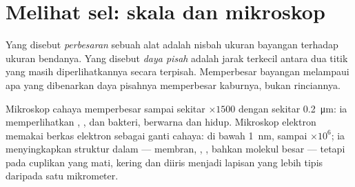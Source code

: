 \section{Melihat sel: skala dan mikroskop}

\begin{definition}\label{def:g10:cells-common-unit:magnification}
Yang disebut \emph{perbesaran} sebuah alat adalah
nisbah ukuran bayangan terhadap ukuran bendanya. Yang disebut
\emph{daya pisah} adalah jarak terkecil antara dua
titik yang masih diperlihatkannya secara terpisah. Memperbesar bayangan
melampaui apa yang dibenarkan daya pisahnya memperbesar kaburnya, bukan
rinciannya.
\end{definition}

\begin{proposition}\label{prop:g10:cells-common-unit:microscopes}
Mikroskop cahaya memperbesar sampai sekitar $\times 1500$ dengan  sekitar \qty{0.2}{\micro m}: ia memperlihatkan , ,
 dan bakteri, berwarna dan hidup. Mikroskop elektron memakai
berkas elektron sebagai ganti cahaya:  di bawah
\qty{1}{nm},  sampai $\times 10^6$; ia menyingkapkan
struktur dalam  --- membran, , , bahkan molekul
besar --- tetapi pada cuplikan yang mati, kering dan diiris menjadi
lapisan yang lebih tipis daripada satu mikrometer.
\end{proposition}
\admitted


